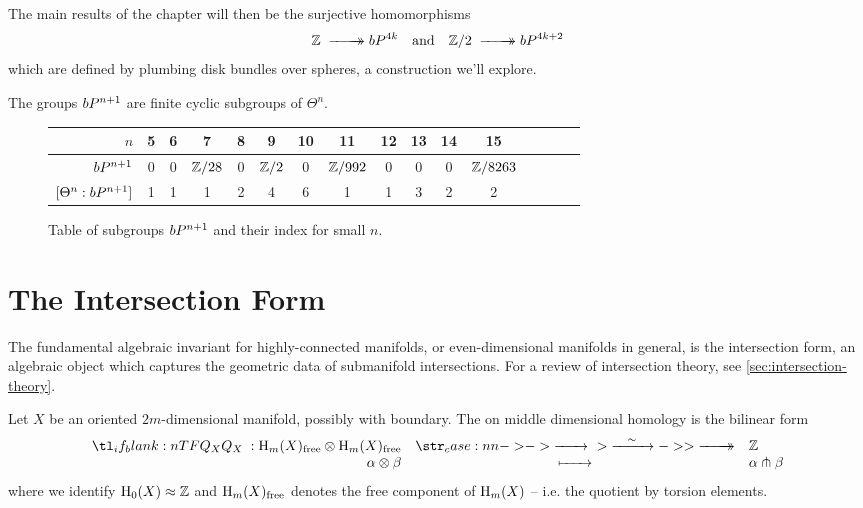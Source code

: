 The main results of the chapter will then be the surjective homomorphisms
\[
	\Z \lkxsurj \bP^{4k}\quad\textrm{and}\quad \Z/2 \lkxsurj \bP^{4k+2}
\]
which are defined by plumbing disk bundles over spheres, a construction we'll explore. 

\begin{corollary}
	The groups $bP^{n+1}$ are finite cyclic subgroups of $\Theta^n$.
\end{corollary}

\begin{figure}[ht]
	\renewcommand{\arraystretch}{1.2}
	\centering
	\begin{tabular}{r|c|c|c|c|c|c|c|c|c|c|c|c|c|c|c}
		\textrm{$n$}                      & 5 & 6 & 7       & 8 & 9      & 10 & 11       & 12 & 13 & 14 & 15        \\
		\hline
		\textrm{$bP^{n+1}$}              & 0 & 0 & $\mathbb{Z}/28$ & 0 & $\mathbb{Z}/2$ & 0  & $\mathbb{Z}/992$ & 0  & 0  & 0  & $\mathbb{Z}/8263$ \\
		\hline
		\textrm{$[\Theta^{n}:bP^{n+1}]$} & 1 & 1 & 1       & 2 & 4      & 6  & 1        & 1  & 3  & 2  & 2         \\
	\end{tabular}
	\medskip
	\caption{Table of subgroups $bP^{n+1}$ and their index for small $n$.}
\end{figure}



\section{The Intersection Form}\label{sec:intersection-form}

The fundamental algebraic invariant for highly-connected manifolds, or even-dimensional manifolds in general, is the intersection form, an algebraic object which captures the geometric data of submanifold intersections. For a review of intersection theory, see \cref{sec:intersection-theory}. 

\begin{definition}
	Let $X$ be an oriented $2m$-dimensional manifold, possibly with boundary. The  on middle dimensional homology is the bilinear form
	\[
		\lkxfunc{Q_X}{\H_m(X)_{\mathrm{free}}\otimes \H_m(X)_{\mathrm{free}}}{\Z}{\alpha\otimes \beta}{\alpha\tnsv \beta}
	\]
	where we identify $\operatorname{H}_0(X)\approx \mathbb{Z}$ and $\operatorname{H}_m(X)_{\mathrm{free}}$ denotes the free component of $\operatorname{H}_m(X)$ -- i.e. the quotient by torsion elements.
\end{definition}

